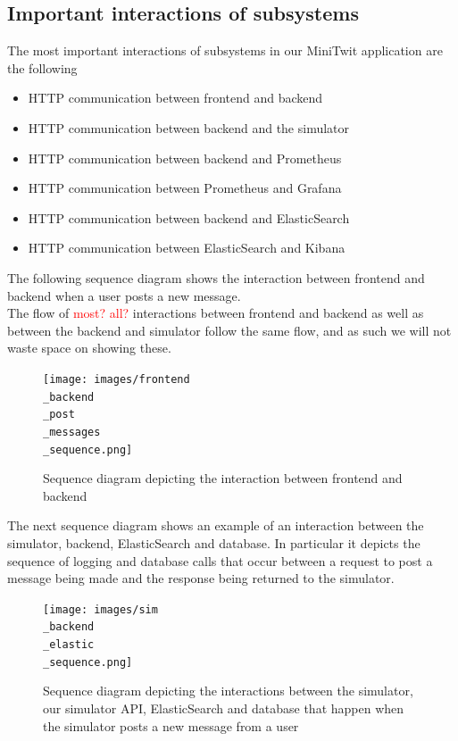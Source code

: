 \subsection{Important interactions of subsystems}
The most important interactions of subsystems in our MiniTwit application are the following 
\begin{itemize}
    \item HTTP communication between frontend and backend
    \item HTTP communication between backend and the simulator
    \item HTTP communication between backend and Prometheus
    \item HTTP communication between Prometheus and Grafana
    \item HTTP communication between backend and ElasticSearch
    \item HTTP communication between ElasticSearch and Kibana
\end{itemize}

The following sequence diagram shows the interaction between frontend and backend when a user posts a new message. \\
The flow of \textcolor{red}{most? all?} interactions between frontend and backend as well as between the backend and simulator follow the same flow, and as such we will not waste space on showing these. 

\begin{figure}[H]
 \centering
 \texttt{[image: images/frontend\\\_backend\\\_post\\\_messages\\\_sequence.png]}
 \caption{Sequence diagram depicting the interaction between frontend and backend}
 \label{fig:SequenceDiagramPostMessage}
\end{figure}

The next sequence diagram shows an example of an interaction between the simulator, backend, ElasticSearch and database. In particular it depicts the sequence of logging and database calls that occur between a request to post a message being made and the response being returned to the simulator.

\begin{figure}[H]
 \centering
 \texttt{[image: images/sim\\\_backend\\\_elastic\\\_sequence.png]}
 \caption{Sequence diagram depicting the interactions between the simulator, our simulator API, ElasticSearch and database that happen when the simulator posts a new message from a user}
 \label{fig:SequenceDiagramElasticBackendSim}
\end{figure}


